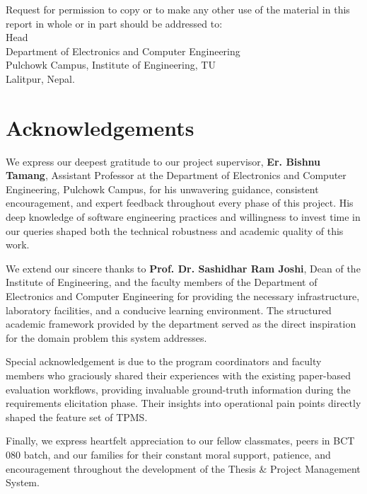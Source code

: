 \documentclass[12pt]{report}
\begin{document}
Request for permission to copy or to make any other use of the material in this report in whole or in part should be addressed to:\\
\newline
Head\\
Department of Electronics and Computer Engineering\\
Pulchowk Campus, Institute of Engineering, TU\\
Lalitpur, Nepal.

\chapter*{Acknowledgements}

We express our deepest gratitude to our project supervisor, \textbf{Er. Bishnu Tamang}, Assistant Professor at the Department of Electronics and Computer Engineering, Pulchowk Campus, for his unwavering guidance, consistent encouragement, and expert feedback throughout every phase of this project. His deep knowledge of software engineering practices and willingness to invest time in our queries shaped both the technical robustness and academic quality of this work.

We extend our sincere thanks to \textbf{Prof. Dr. Sashidhar Ram Joshi}, Dean of the Institute of Engineering, and the faculty members of the Department of Electronics and Computer Engineering for providing the necessary infrastructure, laboratory facilities, and a conducive learning environment. The structured academic framework provided by the department served as the direct inspiration for the domain problem this system addresses.

Special acknowledgement is due to the program coordinators and faculty members who graciously shared their experiences with the existing paper-based evaluation workflows, providing invaluable ground-truth information during the requirements elicitation phase. Their insights into operational pain points directly shaped the feature set of TPMS.

Finally, we express heartfelt appreciation to our fellow classmates, peers in BCT 080 batch, and our families for their constant moral support, patience, and encouragement throughout the development of the Thesis \& Project Management System.

\end{document}
